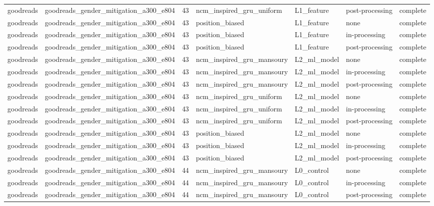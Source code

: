 \begin{table}[htbp!]
\begin{tabular}{llrllll}
goodreads & goodreads\_gender\_mitigation\_a300\_e804 & 43 & ncm\_inspired\_gru\_uniform & L1\_feature & post-processing & complete \\
goodreads & goodreads\_gender\_mitigation\_a300\_e804 & 43 & position\_biased & L1\_feature & none & complete \\
goodreads & goodreads\_gender\_mitigation\_a300\_e804 & 43 & position\_biased & L1\_feature & in-processing & complete \\
goodreads & goodreads\_gender\_mitigation\_a300\_e804 & 43 & position\_biased & L1\_feature & post-processing & complete \\
goodreads & goodreads\_gender\_mitigation\_a300\_e804 & 43 & ncm\_inspired\_gru\_mansoury & L2\_ml\_model & none & complete \\
goodreads & goodreads\_gender\_mitigation\_a300\_e804 & 43 & ncm\_inspired\_gru\_mansoury & L2\_ml\_model & in-processing & complete \\
goodreads & goodreads\_gender\_mitigation\_a300\_e804 & 43 & ncm\_inspired\_gru\_mansoury & L2\_ml\_model & post-processing & complete \\
goodreads & goodreads\_gender\_mitigation\_a300\_e804 & 43 & ncm\_inspired\_gru\_uniform & L2\_ml\_model & none & complete \\
goodreads & goodreads\_gender\_mitigation\_a300\_e804 & 43 & ncm\_inspired\_gru\_uniform & L2\_ml\_model & in-processing & complete \\
goodreads & goodreads\_gender\_mitigation\_a300\_e804 & 43 & ncm\_inspired\_gru\_uniform & L2\_ml\_model & post-processing & complete \\
goodreads & goodreads\_gender\_mitigation\_a300\_e804 & 43 & position\_biased & L2\_ml\_model & none & complete \\
goodreads & goodreads\_gender\_mitigation\_a300\_e804 & 43 & position\_biased & L2\_ml\_model & in-processing & complete \\
goodreads & goodreads\_gender\_mitigation\_a300\_e804 & 43 & position\_biased & L2\_ml\_model & post-processing & complete \\
goodreads & goodreads\_gender\_mitigation\_a300\_e804 & 44 & ncm\_inspired\_gru\_mansoury & L0\_control & none & complete \\
goodreads & goodreads\_gender\_mitigation\_a300\_e804 & 44 & ncm\_inspired\_gru\_mansoury & L0\_control & in-processing & complete \\
goodreads & goodreads\_gender\_mitigation\_a300\_e804 & 44 & ncm\_inspired\_gru\_mansoury & L0\_control & post-processing & complete \\

\end{tabular}
\end{table}
